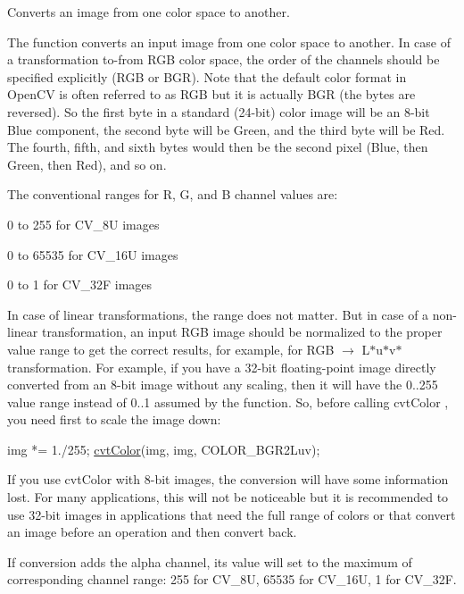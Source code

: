 Converts an image from one color space to another. 

The function converts an input image from one color space to another. In case of a transformation to-\/from R\+GB color space, the order of the channels should be specified explicitly (R\+GB or B\+GR). Note that the default color format in Open\+CV is often referred to as R\+GB but it is actually B\+GR (the bytes are reversed). So the first byte in a standard (24-\/bit) color image will be an 8-\/bit Blue component, the second byte will be Green, and the third byte will be Red. The fourth, fifth, and sixth bytes would then be the second pixel (Blue, then Green, then Red), and so on. 

The conventional ranges for R, G, and B channel values are\+:
\begin{DoxyItemize}
\item 0 to 255 for C\+V\+\_\+8U images
\item 0 to 65535 for C\+V\+\_\+16U images
\item 0 to 1 for C\+V\+\_\+32F images 
\end{DoxyItemize}

In case of linear transformations, the range does not matter. But in case of a non-\/linear transformation, an input R\+GB image should be normalized to the proper value range to get the correct results, for example, for R\+GB $\rightarrow$ L$\ast$u$\ast$v$\ast$ transformation. For example, if you have a 32-\/bit floating-\/point image directly converted from an 8-\/bit image without any scaling, then it will have the 0..255 value range instead of 0..1 assumed by the function. So, before calling cvt\+Color , you need first to scale the image down\+: 
\begin{DoxyPre}
\begin{DoxyCode}
img *= 1./255;
\hyperlink{group__imgproc__misc_gaab99985581c43cce9df680e6586cb9ef}{cvtColor}(img, img, COLOR\_BGR2Luv);
\end{DoxyCode}
 \end{DoxyPre}
 If you use cvt\+Color with 8-\/bit images, the conversion will have some information lost. For many applications, this will not be noticeable but it is recommended to use 32-\/bit images in applications that need the full range of colors or that convert an image before an operation and then convert back. 

If conversion adds the alpha channel, its value will set to the maximum of corresponding channel range\+: 255 for C\+V\+\_\+8U, 65535 for C\+V\+\_\+16U, 1 for C\+V\+\_\+32F. 


